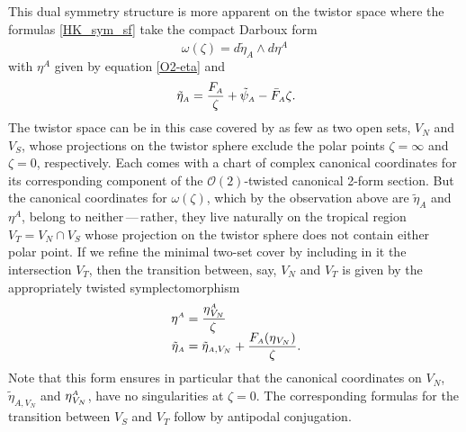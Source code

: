 \documentclass[11pt]{amsart}
\theoremstyle{remark}
\theoremstyle{remark}
\theoremstyle{definition}
\theoremstyle{definition}
\theoremstyle{definition}
\newcommand{\0}{{\scriptstyle 0'}} %
\newcommand{\1}{{\scriptstyle 1'}}
\newcommand{\A}{{\scriptscriptstyle A}} %
\newcommand{\hp}{\hspace{0.5pt}} %
\begin{document}
This dual symmetry structure is more apparent on the twistor space where the formulas \eqref{HK_sym_sf} take the compact Darboux form
\begin{equation}
\omega(\zeta) = d\tilde{\eta}^{\phantom{'}}_{\A} \wedge d\eta^{\A}
\end{equation}
with $\eta^{\A}$ given by equation \eqref{O2-eta} and
\begin{equation} \label{etatilde-sf}
\tilde{\eta}_{\A} = \frac{F_{\A}}{\zeta} + \tilde{\psi}_{\A} - \bar{F}_{\A} \zeta \rlap{.}
\end{equation}
The twistor space can be in this case covered by as few as two open sets, $V_N$ and $V_S$, whose projections on the twistor sphere exclude the polar points $\zeta = \infty$ and $\zeta = 0$, respectively.  Each comes with a chart of complex canonical coordinates for its corresponding component of the $\mathcal{O}(2)$-twisted canonical 2-form section. But the canonical coordinates for $\omega(\zeta)$, which by the observation above are $\tilde{\eta}_{\A}$ and $\eta^{\A}$, belong to neither\,---\,rather, they live naturally on the tropical region $V_T = V_N \cap V_S$ whose projection on the twistor sphere does not contain either polar point. If we refine the minimal two-set cover by including in it the intersection $V_T$, then the transition between, say, $V_N$ and $V_T$ is given by the appropriately twisted symplectomorphism
\begin{equation} \label{N-T-trans}
\begin{aligned}
\eta^{\A} & = \frac{\eta^{\A}_{\hp V_N}}{\zeta \, } \\[-5pt]
\tilde{\eta}_{\A} & = \tilde{\eta}_{\A,V_N} + \frac{F_{\A}(\eta_{\hp V_N})}{\zeta}  \rlap{.}
\end{aligned}
\end{equation}
Note that this form ensures in particular that the canonical coordinates on $V_N$, $\tilde{\eta}_{\A,V_N}$ and $\eta^{\A}_{\hp V_N}$, have no singularities at $\zeta = 0$. The corresponding formulas for the transition between $V_S$ and $V_T$ follow by antipodal conjugation.
\end{document}
